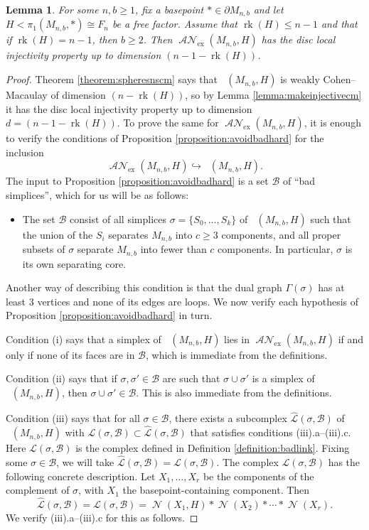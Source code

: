 \documentclass[11pt]{amsart}
\numberwithin{equation}{section}
\theoremstyle{plain}
\newtheorem{lemma}[theorem]{Lemma}
\theoremstyle{definition}
\theoremstyle{remark}
\DeclareMathOperator{\rank}{rk}
\newcommand\cB{\ensuremath{\mathcal{B}}}
\newcommand\cL{\ensuremath{\mathcal{L}}}
\newcommand\hcL{\ensuremath{\widehat{\cL}}}
\DeclareMathOperator{\Spheres}{\mathcal{S}}
\DeclareMathOperator{\SpheresNS}{\Spheres_{\text{ns}}}
\DeclareMathOperator{\NSpheres}{\mathcal{N}}
\DeclareMathOperator{\ANSpheres}{\mathcal{AN}}
\newcommand\ANSpheresEX{\ANSpheres_{\text{ex}}}
\begin{document}
\begin{lemma}
\label{lemma:anspheresurdisc}
For some $n,b \geq 1$, fix a basepoint $\ast \in \partial M_{n,b}$
and let $H < \pi_1(M_{n,b},\ast) \cong F_n$ be a free factor.  Assume
that $\rank(H) \leq n-1$ and that if $\rank(H) = n-1$, then $b \geq 2$.
Then $\ANSpheresEX(M_{n,b},H)$ has
the disc local injectivity property up to dimension $(n-1-\rank(H))$.
\end{lemma}
\begin{proof}
Theorem \ref{theorem:spheresnscm} says that $\SpheresNS(M_{n,b},H)$ is weakly Cohen--Macaulay of dimension
$(n-\rank(H))$, so by Lemma \ref{lemma:makeinjectivecm} it has the disc local injectivity
property up to dimension $d=(n-1-\rank(H))$.  To prove the same for
$\ANSpheresEX(M_{n,b},H)$, it is enough to verify the conditions of
Proposition \ref{proposition:avoidbadhard} for the inclusion
\[\ANSpheresEX(M_{n,b},H) \hookrightarrow \SpheresNS(M_{n,b},H).\]
The input to Proposition \ref{proposition:avoidbadhard} is a set $\cB$ of ``bad simplices'', which
for us will be as follows:
\begin{itemize}
\item The set $\cB$ consist of all simplices $\sigma = \{S_0,\ldots,S_k\}$ of $\SpheresNS(M_{n,b},H)$
such that the union of the $S_i$ separates $M_{n,b}$ into $c \geq 3$ components, and all proper
subsets of $\sigma$ separate $M_{n,b}$ into fewer than $c$ components.  In particular, $\sigma$ is
its own separating core.
\end{itemize}
Another way of describing this condition is that the dual graph $\Gamma(\sigma)$ has at least $3$ vertices
and none of its edges are loops.  We now verify each hypothesis of Proposition \ref{proposition:avoidbadhard} in turn.

Condition (i) says that a simplex of $\SpheresNS(M_{n,b},H)$ lies in $\ANSpheresEX(M_{n,b},H)$ if
and only if none of its faces are in $\cB$, which is immediate from the definitions.

Condition (ii) says that if $\sigma,\sigma' \in \cB$ are such that $\sigma \cup \sigma'$ is a simplex
of $\SpheresNS(M_{n,b},H)$, then $\sigma \cup \sigma' \in \cB$.  This is also immediate from the
definitions.

Condition (iii) says that for all $\sigma \in \cB$, there exists a subcomplex $\hcL(\sigma,\cB)$ of
$\SpheresNS(M_{n,b},H)$ with $\cL(\sigma,\cB) \subset \hcL(\sigma,\cB)$ that satisfies conditions
(iii).a--(iii).c.  Here $\cL(\sigma,\cB)$ is the complex defined in Definition \ref{definition:badlink}.
Fixing some $\sigma \in \cB$, we will take $\hcL(\sigma,\cB) = \cL(\sigma,\cB)$.
The complex $\cL(\sigma,\cB)$ has the following concrete description.  Let $X_1,\ldots,X_r$
be the components of the complement of $\sigma$, with $X_1$ the basepoint-containing component.
Then
\[\hcL(\sigma,\cB) = \cL(\sigma,\cB) = \NSpheres(X_1,H) \ast \NSpheres(X_2) \ast \cdots \ast \NSpheres(X_r).\]
We verify (iii).a--(iii).c for this as follows.


\end{proof}
\end{document}
